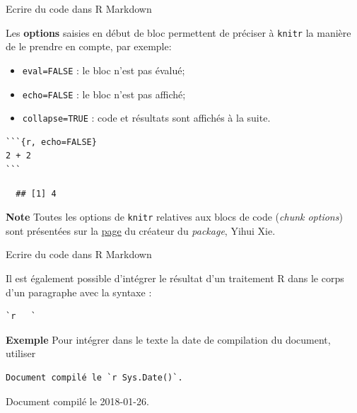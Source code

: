 \documentclass[12pt,handout,ignorenonframetext,]{beamer}
\providecommand{\tightlist}{%
  \setlength{\itemsep}{0pt}\setlength{\parskip}{0pt}}
\begin{document}
\begin{frame}[fragile]{Ecrire du code dans R Markdown}

Les \textbf{options} saisies en début de bloc permettent de préciser à
\texttt{knitr} la manière de le prendre en compte, par exemple:

\begin{itemize}
\tightlist
\item
  \texttt{eval=FALSE} : le bloc n'est pas évalué;
\item
  \texttt{echo=FALSE} : le bloc n'est pas affiché;
\item
  \texttt{collapse=TRUE} : code et résultats sont affichés à la suite.
\end{itemize}

\pause 

\begin{verbatim}
```{r, echo=FALSE}
2 + 2
```
\end{verbatim}

\begin{verbatim}
  ## [1] 4
\end{verbatim}

\pause 

\textbf{Note} Toutes les options de \texttt{knitr} relatives aux blocs
de code (\emph{chunk options}) sont présentées sur la
\href{http://yihui.name/knitr/options/}{\underline{page}} du créateur du
\emph{package}, Yihui Xie.

\end{frame}

\begin{frame}[fragile]{Ecrire du code dans R Markdown}

Il est également possible d'intégrer le résultat d'un traitement R dans
le corps d'un paragraphe avec la syntaxe :

\begin{verbatim}
`r   `
\end{verbatim}

\pause 

\textbf{Exemple} Pour intégrer dans le texte la date de compilation du
document, utiliser

\begin{verbatim}
Document compilé le `r Sys.Date()`.
\end{verbatim}

\pause Document compilé le 2018-01-26.

\end{frame}
\end{document}
